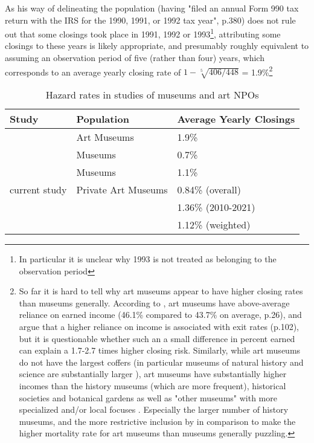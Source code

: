 \documentclass[12pt]{article}
\begin{document}
As his way of delineating the population (having "filed an annual Form 990 tax return with the IRS for the 1990, 1991, or 1992 tax year", p.380) does not rule out that some closings took place in 1991, 1992 or 1993\footnote{In particular it is unclear why 1993 is not treated as belonging to the observation period}, attributing some closings to these years is likely appropriate, and presumably roughly equivalent to assuming an observation period of five (rather than four) years, which corresponds to an average yearly closing rate of \(1-\sqrt[5]{406/448}\) = 1.9\%\footnote{So far it is hard to tell why art museums appear to have higher closing rates than museums generally.
According to \textcite{IMLS_2008_funding}, art museums have above-average reliance on earned income (46.1\% compared to 43.7\% on average, p.26), and \textcite{Bowen_1994_charitable} argue that a higher reliance on income is associated with exit rates (p.102), but it is questionable whether such an a small difference in percent earned can explain a 1.7-2.7 times higher closing risk.
Similarly, while art museums do not have the largest coffers (in particular museums of natural history and science are substantially larger \cite{IMLS_2008_funding,Bowen_1994_charitable}), art museums have substantially higher incomes than the history museums (which are more frequent), historical societies and botanical gardens \parencite{IMLS_2008_funding} as well as "other museums" with more specialized and/or local focuses \parencite{Bowen_1994_charitable}.
Especially the larger number of history museums, and the more restrictive inclusion by \textcite{Hager_2001_vulnerability} in comparison to \textcite{Bowen_1994_charitable} make the higher mortality rate for art museums than museums generally puzzling.} 





\begin{table}[htbp]
\caption{\label{tbl:litreview}Hazard rates in studies of museums and art NPOs}
\centering
\begin{tabular}{lll}
\hline
Study & Population & Average Yearly Closings\\
\hline
\cite{Hager_2001_vulnerability} & Art Museums & 1.9\%\\
\cite{Gordon_etal_2013_insolvency} & Museums & 0.7\%\\
\cite{Bowen_1994_charitable} & Museums & 1.1\%\\
current study & Private Art Museums & 0.84\% (overall)\\
 &  & 1.36\% (2010-2021)\\
 &  & 1.12\% (weighted)\\
\hline
\end{tabular}
\end{table}
\end{document}
